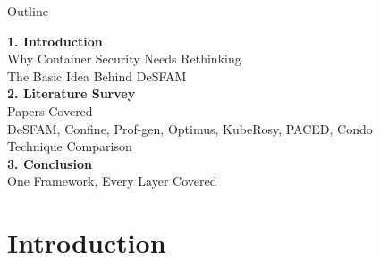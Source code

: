 \documentclass[aspectratio=169,11pt]{beamer}
\begin{document}
\begin{frame}{Outline}
\left
\vspace{0.2cm}

\textbf{\Large\textcolor{SJCETblue}{1. Introduction}}\\[0.15cm]
{\small Why Container Security Needs Rethinking}\\[0.05cm]
{\small The Basic Idea Behind DeSFAM}\\[0.5cm]

\textbf{\Large\textcolor{SJCETblue}{2. Literature Survey}}\\[0.15cm]
{\small Papers Covered}\\[0.05cm]
{\small DeSFAM, Confine, Prof-gen, Optimus, KubeRosy, PACED, Condo}\\[0.05cm]
{\small Technique Comparison}\\[0.5cm]

\textbf{\Large\textcolor{SJCETblue}{3. Conclusion}}\\[0.15cm]
{\small One Framework, Every Layer Covered}

\end{frame}

\section{Introduction}
\end{document}
